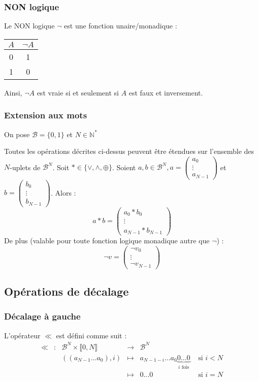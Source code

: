 \documentclass[../../main.tex]{subfiles}
\begin{document}
\subsubsection{NON logique}
Le NON logique $\neg$ est une fonction unaire/monadique :
\begin{center}
\begin{tabular}{c|c}
$A$ & $\neg{A}$ \\
\hline
0 & 1 \\
1 & 0 \\
\end{tabular}
\end{center}
Ainsi, $\neg{A}$ est vraie si et seulement si $A$ est faux et inversement.
\subsubsection{Extension aux mots}
On pose $\mathcal{B} = \{0, 1\}$ et $N\in{\mathbb{N}^{*}}$

Toutes les opérations décrites ci-dessus peuvent être étendues sur l'ensemble des $N$-uplets de $\mathcal{B}^{N}$. \newline
Soit $\ast\in{\{\vee, \wedge, \oplus\}}$. Soient $a, b \in{\mathcal{B}^{N}}, a = \begin{pmatrix}
a_0 \\
\vdots \\
a_{N-1}
\end{pmatrix}$ et $b = \begin{pmatrix}
b_0 \\
\vdots \\
b_{N-1}
\end{pmatrix}$. Alors :
$$a\ast{b} = \begin{pmatrix}
a_0 \ast{b_{0}}\\
\vdots \\
a_{N-1} \ast{b_{N-1}}
\end{pmatrix}$$
De plus (valable pour toute fonction logique monadique autre que $\neg$) :
$$\neg{v} = \begin{pmatrix}
\neg v_{0}\\
\vdots \\
\neg v_{N-1}
\end{pmatrix}$$
\subsection{Opérations de décalage}
\subsubsection{Décalage à gauche}
L'opérateur $\ll$ est défini comme suit :
$$
\begin{array}{lclcll}
\ll & : & \mathcal{B}^{N}\times{\llbracket0, N\rrbracket} & \rightarrow & \mathcal{B}^{N} \\
     &   & ((a_{N-1}\dots a_{0}), i) & \mapsto & a_{N-1-i}\dots a_{0}\underbrace{0\dots 0}_{\text{$i$ fois}} & \text{ si $i < N$} \\
     &   & & \mapsto & 0\dots 0 & \text{ si $i = N$}
\end{array}
$$
\end{document}

